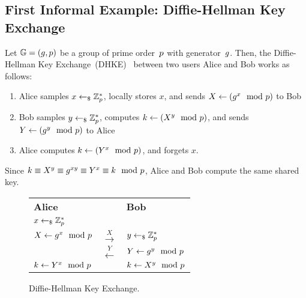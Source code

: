\subsection{First Informal Example: Diffie-Hellman Key Exchange}
\label{sec:overview:dhke}


Let $\mathbb{G}=(g,p)$ be a group of prime order~$p$ with generator~$g$.
Then, the Diffie-Hellman Key Exchange~(DHKE)~\cite{DifHel76} between two users Alice and Bob works as follows:
\begin{enumerate}
    \item Alice samples $x\gets_\$\mathbb{Z}_p^*$, locally stores $x$, and sends $X\gets(g^x\mod{p})$ to Bob
    \item Bob samples $y\gets_\$\mathbb{Z}_p^*$, computes $k\gets(X^y\mod{p})$, and sends $Y\gets(g^y\mod{p})$ to Alice
    \item Alice computes $k\gets(Y^x\mod{p})$, and forgets $x$.
\end{enumerate}
Since $k\equiv X^y\equiv g^{xy}\equiv Y^x\equiv k\mod {p}$, Alice and Bob compute the same shared key.

\begin{figure}
    \centering
    \begin{tabular}{lC{3cm}l}
        \textbf{Alice} & & \textbf{Bob}\\
        $x\gets_\$\mathbb{Z}_p^*$ & &\\
        $X\gets g^x\mod{p}$ & $\xrightarrow{X}$ & $y\gets_\$\mathbb{Z}_p^*$\\
        & $\xleftarrow{Y}$ & $Y\gets g^y\mod{p}$\\
        $k\gets Y^x\mod{p}$ & & $k\gets X^y\mod{p}$\\
    \end{tabular}
    \caption{Diffie-Hellman Key Exchange.}
    \label{fig:dhke}
\end{figure}


